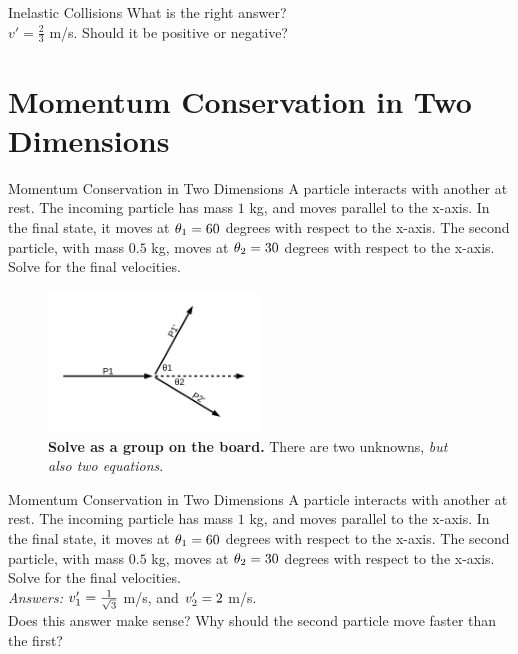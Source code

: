 \documentclass{beamer}
\begin{document}
\begin{frame}{Inelastic Collisions}
What is the right answer? \\ \vspace{0.5cm}
$v' = \frac{2}{3}$ m/s.  Should it be positive or negative?
\end{frame}

\section{Momentum Conservation in Two Dimensions}

\begin{frame}{Momentum Conservation in Two Dimensions}
\small
A particle interacts with another at rest.  The incoming particle has mass $1$ kg, and moves parallel to the x-axis.  In the final state, it moves at $\theta_{\rm 1} = 60$ degrees with respect to the x-axis.  The second particle, with mass $0.5$ kg, moves at $\theta_{\rm 2} = 30$ degrees with respect to the x-axis.  Solve for the final velocities. \\ \vspace{0.5cm}
\begin{figure}
\centering
\includegraphics[width=0.5\textwidth]{figures/2d_1.pdf}
\caption{\label{fig:2d_1} \textbf{Solve as a group on the board.}  There are two unknowns, \alert{\textit{but also two equations}.}}
\end{figure}
\end{frame}

\begin{frame}{Momentum Conservation in Two Dimensions}
\small
A particle interacts with another at rest.  The incoming particle has mass $1$ kg, and moves parallel to the x-axis.  In the final state, it moves at $\theta_{\rm 1} = 60$ degrees with respect to the x-axis.  The second particle, with mass $0.5$ kg, moves at $\theta_{\rm 2} = 30$ degrees with respect to the x-axis.  Solve for the final velocities. \\ \vspace{0.5cm}
\textit{Answers:} $v_{\rm 1}' = \frac{1}{\sqrt{3}}$ m/s, and $v_{\rm 2}' = 2$ m/s. \\ \vspace{0.5cm}
Does this answer make sense?  Why should the second particle move faster than the first?
\end{frame}
\end{document}
